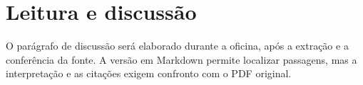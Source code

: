 \chapter{Leitura e discussão}
O parágrafo de discussão será elaborado durante a oficina, após a extração e a conferência da fonte. A versão em Markdown permite localizar passagens, mas a interpretação e as citações exigem confronto com o PDF original.
